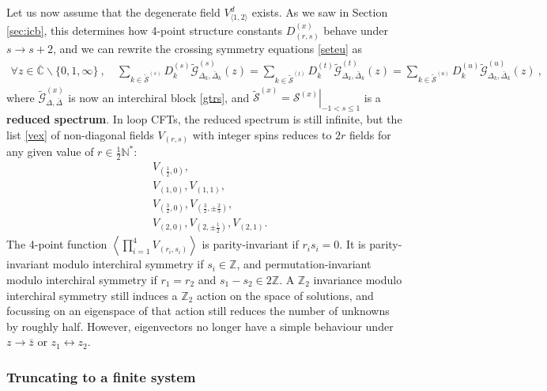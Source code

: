 \documentclass[12pt, a4paper]{article}
\newcommand{\myindex}[1]{\textbf{\boldmath #1}}
\begin{document}
Let us now assume that the degenerate field $V^d_{\langle 1,2\rangle}$ exists. 
As we saw in Section \ref{sec:icb}, this determines how 4-point structure constants $D^{(x)}_{(r,s)}$ behave under $s\to s+2$, and we can rewrite the crossing symmetry equations \eqref{seteu} as 
\begin{align}
 \forall z\in \overline{\mathbb{C}}\backslash\{0,1,\infty\} \ , \quad \sum_{k\in\widetilde{\mathcal{S}}^{(s)}} D_k^{(s)} \widetilde{\mathcal{G}}^{(s)}_{\Delta_k,\bar\Delta_k}(z) = \sum_{k\in\widetilde{\mathcal{S}}^{(t)}} D_k^{(t)} \widetilde{\mathcal{G}}^{(t)}_{\Delta_k,\bar\Delta_k}(z) = \sum_{k\in\widetilde{\mathcal{S}}^{(u)}} D_k^{(u)} \widetilde{\mathcal{G}}^{(u)}_{\Delta_k,\bar\Delta_k}(z)\ ,
\end{align}
where $\widetilde{\mathcal{G}}^{(x)}_{\Delta,\bar\Delta}$ is now an interchiral block \eqref{gtrs}, and $\widetilde{\mathcal{S}}^{(x)}=\left.\mathcal{S}^{(x)}\right|_{-1<s\leq 1}$ is a \myindex{reduced spectrum}. In loop CFTs, the reduced spectrum is still infinite, but the list \eqref{vex} of non-diagonal fields $V_{(r,s)}$ with integer spins reduces to $2r$ fields for any given value of $r\in\frac12\mathbb{N}^*$:
\begin{subequations}
\label{vexr}
\begin{align}
 & V_{(\frac12, 0)},
 \\
 & V_{(1,0)}, V_{(1,1)}, 
 \\
 & V_{(\frac32, 0)}, V_{(\frac32, \pm\frac23)}, 
 \\
 & V_{(2, 0)}, V_{(2,\pm\frac12)}, V_{(2,1)}.
\end{align}
\end{subequations}
The 4-point function $\left<\prod_{i=1}^4 V_{(r_i,s_i)}\right>$ is parity-invariant if $r_is_i=0$. It is parity-invariant 
modulo interchiral symmetry if $s_i\in\mathbb{Z}$, and permutation-invariant modulo interchiral symmetry if $r_1=r_2$ and $s_1-s_2\in 2\mathbb{Z}$. A $\mathbb{Z}_2$ invariance modulo interchiral symmetry still induces a $\mathbb{Z}_2$ action on the space of solutions, and focussing on an eigenspace of that action still reduces the number of unknowns by roughly half. However, eigenvectors no longer have a simple behaviour under $z\to \bar z$ or $z_1\leftrightarrow z_2$.


\subsubsection{Truncating to a finite system}
\end{document}
